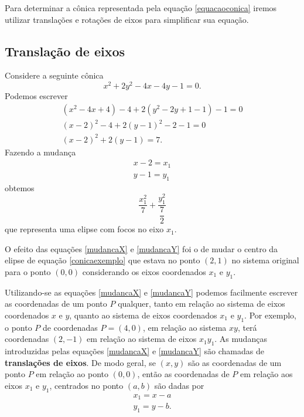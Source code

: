 Para determinar a c\^onica representada pela equa\c{c}\~ao \eqref{equacaoconica} iremos utilizar transla\c{c}\~oes e rota\c{c}\~oes de eixos para simplificar sua equa\c{c}\~ao.

\subsection{Transla\c{c}\~ao de eixos} %
\label{sub:translacaoo_de_eixos}
Considere a seguinte c\^onica
\begin{equation}\label{conicaexemplo}
  x^2 + 2y^2 - 4x - 4y - 1 = 0.
\end{equation}
Podemos escrever
\begin{align*}
  (x^2 - 4x + 4) - 4 + 2(y^2 - 2y + 1 - 1) - 1 = 0\\
  (x - 2)^2 - 4 + 2(y - 1)^2 - 2 - 1 = 0\\
  (x - 2)^2 + 2(y - 1) = 7.
\end{align*}
Fazendo a mudan\c{c}a
\begin{align}
  x - 2 = x_1\label{mudancaX}\\
  y - 1 = y_1\label{mudancaY}
\end{align}
obtemos
\[
  \dfrac{x_1^2}{7} + \dfrac{y_1^2}{\dfrac{7}{2}}
\]
que representa uma elipse com focos no eixo $x_1$.

O efeito das equa\c{c}\~oes \eqref{mudancaX} e \eqref{mudancaY} foi o de mudar o centro da elipse de equa\c{c}\~ao \eqref{conicaexemplo} que estava no ponto $(2,1)$ no sistema original para o ponto $(0,0)$ considerando os eixos coordenados $x_1$ e $y_1$. 

Utilizando-se as equa\c{c}\~oes \eqref{mudancaX} e \eqref{mudancaY} podemos facilmente escrever as coordenadas de um ponto $P$ qualquer, tanto em rela\c{c}\~ao ao sistema de eixos coordenados $x$ e $y$, quanto ao sistema de eixos coordenados $x_1$ e $y_1$. Por exemplo, o ponto $P$ de coordenadas $P = (4,0)$, em rela\c{c}\~ao ao sistema $xy$, ter\'a coordenadas $(2,-1)$ em rela\c{c}\~ao ao sistema de eixos $x_1y_1$. As mudan\c{c}as introduzidas pelas equa\c{c}\~oes \eqref{mudancaX} e \eqref{mudancaY} s\~ao chamadas de \textbf{transla\c{c}\~oes de eixos}. De modo geral, se $(x,y)$ s\~ao as coordenadas de um ponto $P$ em rela\c{c}\~ao ao ponto $(0,0)$, ent\~ao as coordenadas de $P$ em rela\c{c}\~ao aos eixos $x_1$ e $y_1$, centrados no ponto $(a,b)$ s\~ao dadas por
\begin{align}
  x_1 = x - a\label{mudancaXgeral}\\
  y_1 = y - b\label{mudancaYgeral}.
\end{align}

